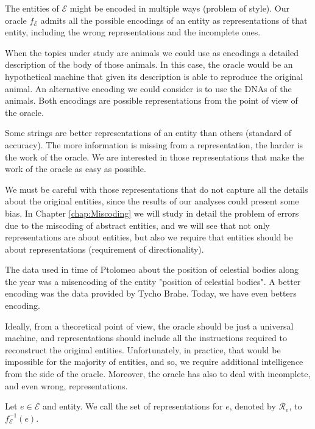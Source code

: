 The entities of $\mathcal{E}$ might be encoded in multiple ways (problem of style). Our oracle $f_\mathcal{E}$ admits all the possible encodings of an entity as representations of that entity, including the wrong representations and the incomplete ones.

\begin{example}
When the topics under study are animals we could use as encodings a detailed description of the body of those animals. In this case, the oracle would be an hypothetical machine that given its description is able to reproduce the original animal. An alternative encoding we could consider is to use the DNAs of the animals. Both encodings are possible representations from the point of view of the oracle.
\end{example}

Some strings are better representations of an entity than others (standard of accuracy). The more information is missing from a representation, the harder is the work of the oracle. We are interested in those representations that make the work of the oracle as easy as possible.

We must be careful with those representations that do not capture all the details about the original entities, since the results of our analyses could present some bias. In Chapter \ref{chap:Miscoding} we will study in detail the problem of errors due to the miscoding of abstract entities, and we will see that not only representations are about entities, but also we require that entities should be about representations (requirement of directionality).

\begin{example}
The data used in time of Ptolomeo about the position of celestial bodies along the year was a misencoding of the entity "position of celestial bodies". A better encoding was the data provided by Tycho Brahe. Today, we have even betters encoding.
\end{example}

Ideally, from a theoretical point of view, the oracle should be just a universal machine, and representations should include all the instructions required to reconstruct the original entities. Unfortunately, in practice, that would be impossible for the majority of entities, and so, we require additional intelligence from the side of the oracle. Moreover, the oracle has also to deal with incomplete, and even wrong, representations.

\begin{definition}
\label{def:descriptions_topic}
Let $e \in \mathcal{E}$ and entity. We call the set of representations for $e$, denoted by $\mathcal{R}_e$, to $f_\mathcal{E}^{-1}(e)$.
\end{definition}

